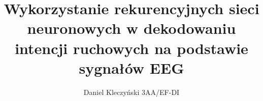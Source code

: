 \documentclass{article}
\author{Daniel Kleczyński 3AA/EF-DI}
\title{Wykorzystanie rekurencyjnych sieci neuronowych w
dekodowaniu intencji ruchowych na podstawie sygnałów EEG}
\begin{document}
    \maketitle
    \blankpage
    \tableofcontents
    \clearpage
    \blankpage
    
    
    
    
    
    
    
    
    \clearpage
    \blankpage
    \printbibliography
\end{document}
